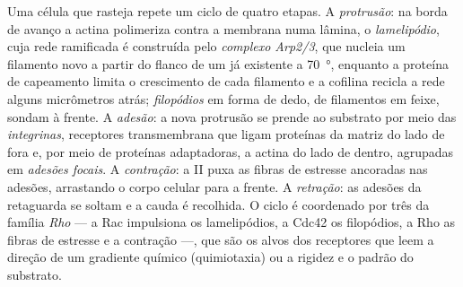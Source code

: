 \begin{definition}\label{def:b3:cytoskeleton-motility:migration}
Uma célula que rasteja repete um ciclo de quatro etapas. A
\emph{protrusão}: na borda de avanço a actina polimeriza contra a
membrana numa lâmina, o \emph{lamelipódio}, cuja rede ramificada é
construída pelo \emph{complexo Arp2/3}, que nucleia um filamento novo a
partir do flanco de um já existente a \qty{70}{\degree}, enquanto a
proteína de capeamento limita o crescimento de cada filamento e a
cofilina recicla a rede alguns micrômetros atrás; \emph{filopódios} em
forma de dedo, de filamentos em feixe, sondam à frente. A
\emph{adesão}: a nova protrusão se prende ao substrato por meio das
\emph{integrinas}, receptores transmembrana que ligam proteínas da
matriz do lado de fora e, por meio de proteínas adaptadoras, a actina
do lado de dentro, agrupadas em \emph{adesões focais}. A
\emph{contração}: a  II puxa as fibras de estresse ancoradas nas
adesões, arrastando o corpo celular para a frente. A \emph{retração}:
as adesões da retaguarda se soltam e a cauda é recolhida. O ciclo é
coordenado por três  da família \emph{Rho} --- a Rac
impulsiona os lamelipódios, a Cdc42 os filopódios, a Rho as fibras de
estresse e a contração ---, que são os alvos dos receptores que leem a
direção de um gradiente químico (quimiotaxia) ou a rigidez e o padrão
do substrato.
\end{definition}

